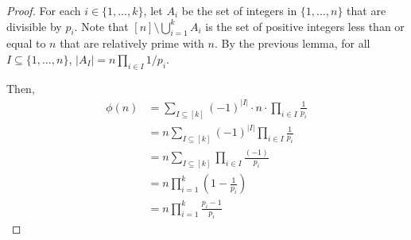 \begin{proof}
    For each $i \in \{1,\ldots,k\}$, let $A_i$ be the set of integers in $\{1,\ldots,n\}$ that are divisible by $p_i$. Note that $[n] \setminus \bigcup_{i=1}^k A_i$ is the set of positive integers less than or equal to $n$ that are relatively prime with $n$. By the previous lemma, for all $I \subseteq \{1,\ldots,n\}$, $|A_I| = n \prod_{i \in I} 1/p_i$.

    Then,
    $$
    \begin{aligned}
        \phi(n) &= \sum_{I \subseteq [k]} (-1)^{|I|} \cdot n \cdot \prod_{i \in I} \frac{1}{p_i} \\
        &= n \sum_{I \subseteq [k]} (-1)^{|I|} \prod_{i \in I} \frac{1}{p_i} \\
        &= n \sum_{I \subseteq [k]} \prod_{i \in I} \frac{(-1)}{p_i} \\
        &= n \prod_{i=1}^k \left( 1 - \frac{1}{p_i} \right) \\
        &= n \prod_{i=1}^k \frac{p_i - 1}{p_i}
    \end{aligned}
    $$
\end{proof}